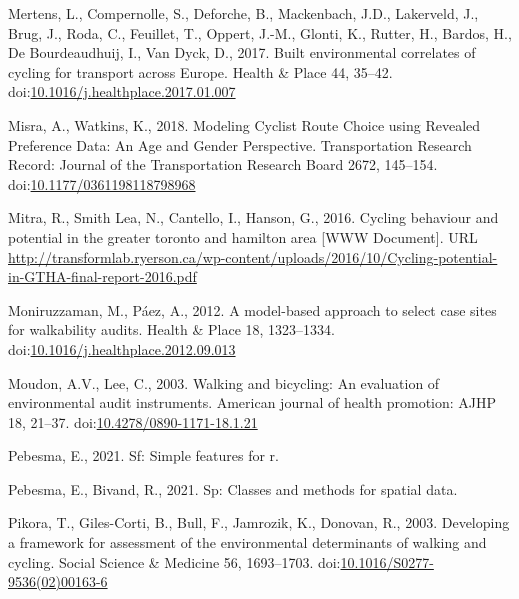 \documentclass[]{elsarticle} %
\begin{document}
\leavevmode\hypertarget{ref-mertensBuiltEnvironmentalCorrelates2017}{}%
Mertens, L., Compernolle, S., Deforche, B., Mackenbach, J.D., Lakerveld,
J., Brug, J., Roda, C., Feuillet, T., Oppert, J.-M., Glonti, K., Rutter,
H., Bardos, H., De Bourdeaudhuij, I., Van Dyck, D., 2017. Built
environmental correlates of cycling for transport across Europe. Health
\& Place 44, 35--42.
doi:\href{https://doi.org/10.1016/j.healthplace.2017.01.007}{10.1016/j.healthplace.2017.01.007}

\leavevmode\hypertarget{ref-misraModelingCyclistRoute2018}{}%
Misra, A., Watkins, K., 2018. Modeling Cyclist Route Choice using
Revealed Preference Data: An Age and Gender Perspective. Transportation
Research Record: Journal of the Transportation Research Board 2672,
145--154.
doi:\href{https://doi.org/10.1177/0361198118798968}{10.1177/0361198118798968}

\leavevmode\hypertarget{ref-Mitra2016}{}%
Mitra, R., Smith Lea, N., Cantello, I., Hanson, G., 2016. Cycling
behaviour and potential in the greater toronto and hamilton area {[}WWW
Document{]}. URL
\url{http://transformlab.ryerson.ca/wp-content/uploads/2016/10/Cycling-potential-in-GTHA-final-report-2016.pdf}

\leavevmode\hypertarget{ref-moniruzzamanModelbasedApproachSelect2012}{}%
Moniruzzaman, M., Páez, A., 2012. A model-based approach to select case
sites for walkability audits. Health \& Place 18, 1323--1334.
doi:\href{https://doi.org/10.1016/j.healthplace.2012.09.013}{10.1016/j.healthplace.2012.09.013}

\leavevmode\hypertarget{ref-moudonWalkingBicyclingEvaluation2003}{}%
Moudon, A.V., Lee, C., 2003. Walking and bicycling: An evaluation of
environmental audit instruments. American journal of health promotion:
AJHP 18, 21--37.
doi:\href{https://doi.org/10.4278/0890-1171-18.1.21}{10.4278/0890-1171-18.1.21}

\leavevmode\hypertarget{ref-R-sf}{}%
Pebesma, E., 2021. Sf: Simple features for r.

\leavevmode\hypertarget{ref-R-sp}{}%
Pebesma, E., Bivand, R., 2021. Sp: Classes and methods for spatial data.

\leavevmode\hypertarget{ref-pikoraDevelopingFrameworkAssessment2003}{}%
Pikora, T., Giles-Corti, B., Bull, F., Jamrozik, K., Donovan, R., 2003.
Developing a framework for assessment of the environmental determinants
of walking and cycling. Social Science \& Medicine 56, 1693--1703.
doi:\href{https://doi.org/10.1016/S0277-9536(02)00163-6}{10.1016/S0277-9536(02)00163-6}
\end{document}
